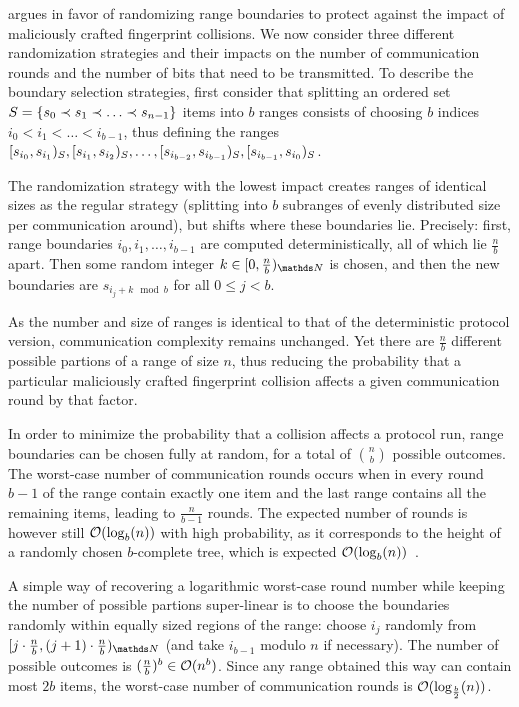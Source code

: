  argues in favor of randomizing range boundaries to protect against the impact of maliciously crafted fingerprint collisions. We now consider three different randomization strategies and their impacts on the number of communication rounds and the number of bits that need to be transmitted. To describe the boundary selection strategies, first consider that splitting an ordered set $S = \{s_0 \prec s_1 \prec \ldots \prec s_{n - 1}\}$ items into $b$ ranges consists of choosing $b$ indices $i_0 < i_1 < \ldots < i_{b-1}$, thus defining the ranges $[{s_{i_0}},{s_{i_1}})_{S}, [{s_{i_1}},{s_{i_2}})_{S}, \ldots, [{s_{i_{b - 2}}},{s_{i_{b - 1}}})_{S}, [{s_{i_{b - 1}}},{s_{i_0}})_{S}$.

The randomization strategy with the lowest impact creates ranges of identical sizes as the regular strategy (splitting into $b$ subranges of evenly distributed size per communication around), but shifts where these boundaries lie. Precisely: first, range boundaries $i_0, i_1, \ldots, i_{b - 1}$ are computed deterministically, all of which lie $\frac{n}{b}$ apart. Then some random integer $k \in \range{0}{\frac{n}{b}}{\N}$ is chosen, and then the new boundaries are $s_{i_j + k \mod b}$ for all $0 \leq j < b$.

 As the number and size of ranges is identical to that of the deterministic protocol version, communication complexity remains unchanged. Yet there are $\frac{n}{b}$ different possible partions of a range of size $n$, thus reducing the probability that a particular maliciously crafted fingerprint collision affects a given communication round by that factor.

In order to minimize the probability that a collision affects a protocol run, range boundaries can be chosen fully at random, for a total of $\binom{n}{b}$ possible outcomes. The worst-case number of communication rounds occurs when in every round $b-1$ of the range contain exactly one item and the last range contains all the remaining items, leading to $\frac{n}{b - 1}$ rounds. The expected number of rounds is however still $\mathcal{O}(\log_b(n))$ with high probability, as it corresponds to the height of a randomly chosen $b$-complete tree, which is expected $\mathcal{O}(\log_b(n))$~\cite{devroye1990height}.

A simple way of recovering a logarithmic worst-case round number while keeping the number of possible partions super-linear is to choose the boundaries randomly within equally sized regions of the range: choose $i_j$ randomly from $\range{j \cdot \frac{n}{b}}{(j + 1) \cdot \frac{n}{b}}{\N}$ (and take $i_{b - 1}$ modulo $n$ if necessary). The number of possible outcomes is $(\frac{n}{b})^b \in \mathcal{O}(n^b)$. Since any range obtained this way can contain most $2b$ items, the worst-case number of communication rounds is $\mathcal{O}(\log_{\frac{b}{2}}(n))$.

